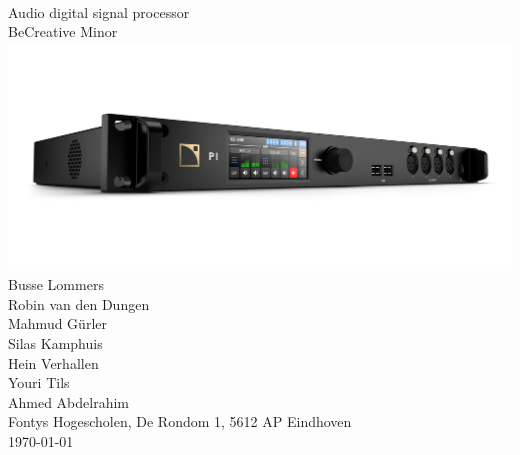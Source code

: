 \documentclass[11pt, a4paper]{report}
\begin{document}
\pagestyle{empty}
\centering
\fontsize{2cm}{2cm}\selectfont{Research document} \\
\vspace{2mm}
\fontsize{1cm}{1cm}\selectfont Audio digital signal processor \\
\vspace{2mm}
\large BeCreative Minor\\
\normalsize
\vspace{4cm}
\includegraphics[width=\linewidth]{3DR_P1_Perspective.png}\\
\vfill
\normalsize Busse Lommers \\
Robin van den Dungen \\
Mahmud Gürler \\
Silas Kamphuis \\
Hein Verhallen \\
Youri Tils \\
Ahmed Abdelrahim \\
Fontys Hogescholen, De Rondom 1, 5612 AP Eindhoven \\
\today
\end{document}

